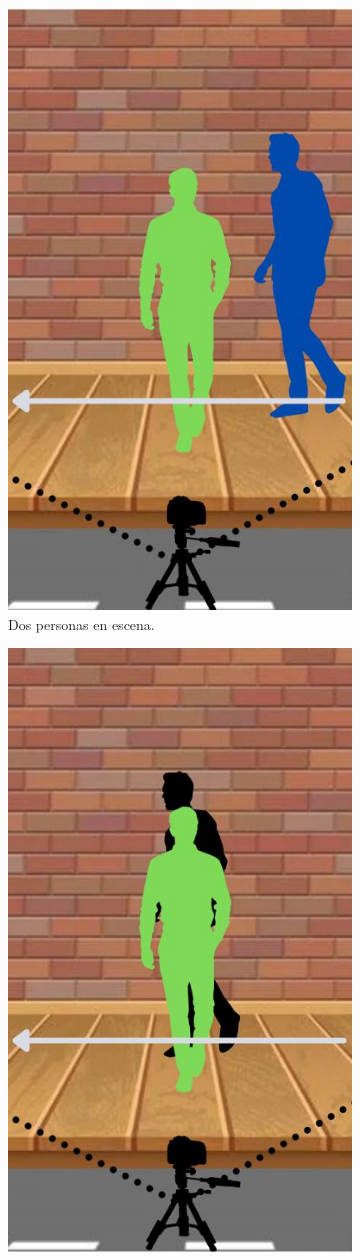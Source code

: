 \begin{figure}[!htpb]
     \centering
     \begin{subfigure}[b]{0.3\textwidth}
         \centering
         \includegraphics[width=.65\textwidth]{./Figures/id_lost1.jpg}
         \caption{Dos personas en escena.}
         \label{fig:id_lost1de3}
     \end{subfigure}
     \hfill
     \begin{subfigure}[b]{0.3\textwidth}
         \centering
         \includegraphics[width=.65\textwidth]{./Figures/id_lost2.jpg}

\end{subfigure}
\end{figure}
